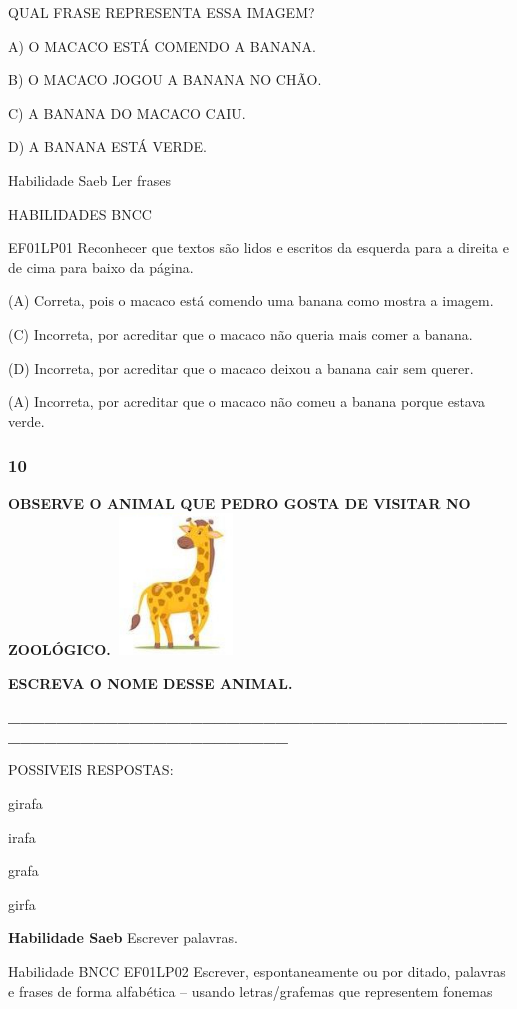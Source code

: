 \begin{escola}
QUAL FRASE REPRESENTA ESSA IMAGEM?

A) O MACACO ESTÁ COMENDO A BANANA.

B) O MACACO JOGOU A BANANA NO CHÃO.

C) A BANANA DO MACACO CAIU.

D) A BANANA ESTÁ VERDE.

Habilidade Saeb Ler frases

HABILIDADES BNCC

EF01LP01 Reconhecer que textos são lidos e escritos da esquerda para a
direita e de cima para baixo da página.

(A) Correta, pois o macaco está comendo uma banana como mostra a imagem.

(C) Incorreta, por acreditar que o macaco não queria mais comer a
banana.

(D) Incorreta, por acreditar que o macaco deixou a banana cair sem
querer.

(A) Incorreta, por acreditar que o macaco não comeu a banana porque
estava verde.

\subsubsection{10}\label{section-50}

\textbf{OBSERVE O ANIMAL QUE PEDRO GOSTA DE VISITAR NO
ZOOLÓGICO.}\includegraphics[width=1.36806in,height=1.47778in]{media/image219.jpg}

\textbf{ESCREVA O NOME DESSE ANIMAL.}

\textbf{\_\_\_\_\_\_\_\_\_\_\_\_\_\_\_\_\_\_\_\_\_\_\_\_\_\_\_\_\_\_\_\_\_\_\_\_\_\_\_\_\_\_\_\_\_\_\_\_\_\_\_\_\_\_\_\_\_\_\_\_\_\_\_\_}

POSSIVEIS RESPOSTAS:

girafa

irafa

grafa

girfa

\textbf{Habilidade Saeb} Escrever palavras.

Habilidade BNCC EF01LP02 Escrever, espontaneamente ou por ditado,
palavras e frases de forma alfabética -- usando letras/grafemas que
representem fonemas


\end{escola}
